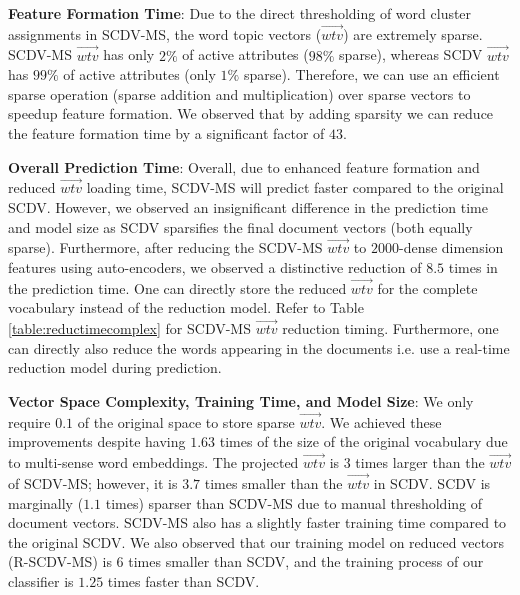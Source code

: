 \documentclass{ecai}
\begin{document}
\vspace{0.3em}
\noindent \textbf{Feature Formation Time}: Due to the direct thresholding of word cluster assignments in SCDV-MS, the word topic vectors ($\vec{wtv}$) are extremely sparse. SCDV-MS $\vec{wtv}$ has only $2\%$ of active attributes ($98\%$ sparse), whereas SCDV $\vec{wtv}$ has $99\%$ of active attributes (only $1\%$ sparse). Therefore, we can use an efficient sparse operation (sparse addition and multiplication) over sparse vectors to speedup feature formation. We observed that by adding sparsity we can reduce the feature formation time by a significant factor of $43$.

\vspace{0.3em}
\noindent \textbf{Overall Prediction Time}: Overall, due to enhanced feature formation and reduced $\vec{wtv}$ loading time, SCDV-MS will predict faster compared to the original SCDV. However, we observed an insignificant difference in the prediction time and model size as SCDV sparsifies the final document vectors (both equally sparse). Furthermore, after reducing the SCDV-MS $\vec{wtv}$ to $2000$-dense dimension features using auto-encoders, we observed a distinctive reduction of $8.5$ times in the prediction time. One can directly store the reduced $\vec{wtv}$ for the complete vocabulary instead of the reduction model.  Refer to Table \ref{table:reductimecomplex} for SCDV-MS $\vec{wtv}$ reduction timing. Furthermore, one can directly also reduce the words appearing in the documents i.e. use a real-time reduction model during prediction.


\vspace{0.3em}
\noindent \textbf{Vector Space Complexity, Training Time, and Model Size}:  We only require $0.1$ of the original space to store sparse $\vec{wtv}$. We achieved these improvements despite having $1.63$ times of the size of the original vocabulary due to multi-sense word embeddings. The projected $\vec{wtv}$ is $3$ times larger than the $\vec{wtv}$ of SCDV-MS; however, it is $3.7$ times smaller than the $\vec{wtv}$ in SCDV. SCDV is marginally ($1.1 $ times) sparser than SCDV-MS due to manual thresholding of document vectors. SCDV-MS also has a slightly faster training time compared to the original SCDV. We also observed that our training model on reduced vectors (R-SCDV-MS) is $6$ times smaller than SCDV, and the training process of our classifier is $1.25$ times faster than SCDV. 
\end{document}
